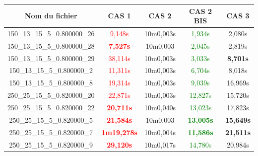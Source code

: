 \documentclass[a4paper, 10pt]{article}
\begin{document}
     \begin{minipage}[t]{0.6\linewidth}
       \footnotesize
         \begin{tabular}{ |c|c|c|c|c| }
           \hline
           \textbf{Nom du fichier} & \textbf{CAS 1} &\textcolor[gray]{0.6}{ \textbf{CAS 2}} & \textbf{CAS 2 BIS} & \textbf{CAS 3} \\
           \hline
           \scriptsize{150\_13\_15\_5\_0.800000\_26} & \textcolor{red}{9,148s} & \textcolor[gray]{0.6}{10m0,003s} & \textcolor{green}{1,934s} & 2,080s\\
           \hline
           \scriptsize{150\_13\_15\_5\_0.800000\_28} & \textbf{\textcolor{red}{7,527s}} & \textcolor[gray]{0.6}{10m0,003 }& \textcolor{green}{2,045s} & 2,819s \\
           \hline
           \scriptsize{150\_13\_15\_5\_0.800000\_29} & \textcolor{red}{38,114s} & \textcolor[gray]{0.6}{10m0,003s} & \textcolor{green}{3,033s} & \textbf{8,701s} \\
           \hline
           \scriptsize{150\_13\_15\_5\_0.800000\_2} & \textcolor{red}{11,311s} & \textcolor[gray]{0.6}{10m0,003s} & \textcolor{green}{6,704s} & 8,018s \\
           \hline
           \scriptsize{150\_13\_15\_5\_0.800000\_8} & \textcolor{red}{19,314s} & \textcolor[gray]{0.6}{10m0,003s} & \textcolor{green}{9,039s} & 16,969s \\
           \hline
           \scriptsize{250\_25\_15\_5\_0.820000\_20} & \textcolor{red}{22,871s} & \textcolor[gray]{0.6}{10m0,003s} & \textcolor{green}{12,827s} & 15,720s \\
           \hline
           \scriptsize{250\_25\_15\_5\_0.820000\_22} & \textbf{\textcolor{red}{20,711s}} & \textcolor[gray]{0.6}{10m0,040s} & \textcolor{green}{13,023s} & 17,823s \\
           \hline
           \scriptsize{250\_25\_15\_5\_0.820000\_5} & \textbf{\textcolor{red}{21,584s}} & \textcolor[gray]{0.6}{10m0,003 }& \textbf{\textcolor{green}{13,005s}} & \textbf{15,649s} \\
           \hline
           \scriptsize{250\_25\_15\_5\_0.820000\_7} & \textbf{\textcolor{red}{1m19,278s}}& \textcolor[gray]{0.6}{10m0,004s} &\textbf{ \textcolor{green}{11,586s}} & \textbf{21,511s} \\
           \hline
           \scriptsize{250\_25\_15\_5\_0.820000\_9} & \textbf{\textcolor{red}{29,120s}} & \textcolor[gray]{0.6}{10m0,017s} & \textcolor{green}{14,780s} & 20,984s \\
           \hline

\end{tabular}
\end{minipage}
\end{document}
